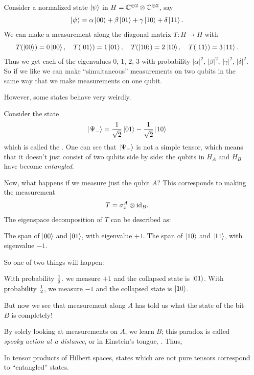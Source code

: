 \begin{example}
	\label{ex:simult_measurement}
	Consider a normalized state $\ket\psi$ in
	$H = \mathbb C^{\oplus 2} \otimes \mathbb C^{\oplus 2}$, say
	\[ \ket\psi = \alpha\ket{00} + \beta\ket{01}
		+ \gamma\ket{10} + \delta\ket{11}. \]
	We can make a measurement along the diagonal matrix
	$T \colon H \to H$ with
	\[ T(\ket{00}) = 0\ket{00}, \quad
	T(\ket{01}) = 1\ket{01}, \quad
	T(\ket{10}) = 2\ket{10}, \quad
	T(\ket{11}) = 3\ket{11}. \]
	Thus we get each of the eigenvalues $0$, $1$, $2$, $3$
	with probability $|\alpha|^2$, $|\beta|^2$, $|\gamma|^2$, $|\delta|^2$.
	So if we like we can make ``simultaneous'' measurements on two qubits
	in the same way that we make measurements on one qubit.
\end{example}

However, some states behave very weirdly.
\begin{example}
	Consider the state
	\[
		\ket{\Psi_-}
		=
		\frac{1}{\sqrt2} \ket{01}
		- \frac{1}{\sqrt2} \ket{10}
	\]
	which is called the .
	One can see that $\ket{\Psi_-}$ is not a simple tensor,
	which means that it doesn't just consist of two qubits side by side:
	the qubits in $H_A$ and $H_B$ have become \emph{entangled}.

	Now, what happens if we measure just the qubit $A$?
	This corresponds to making the measurement
	\[ T = \sigma_z^A \otimes \mathrm{id}_B. \]
	The eigenspace decomposition of $T$ can be described as:
	\begin{itemize}
		\ii The span of $\ket{00}$ and $\ket{01}$, with eigenvalue $+1$.
		\ii The span of $\ket{10}$ and $\ket{11}$, with eigenvalue $-1$.
	\end{itemize}
	So one of two things will happen:
	\begin{itemize}
		\ii With probability $\frac{1}{2}$, we measure $+1$
		and the collapsed state is $\ket{01}$.
		\ii With probability $\frac{1}{2}$, we measure $-1$
		and the collapsed state is $\ket{10}$.
	\end{itemize}
	But now we see that measurement along $A$ has told us what the
	state of the bit $B$ is completely!
\end{example}
By solely looking at measurements on $A$, we learn $B$;
this paradox is called \emph{spooky action at a distance},
or in Einstein's tongue, .
Thus,
\begin{moral}
	In tensor products of Hilbert spaces,
	states which are not pure tensors
	correspond to ``entangled'' states.
\end{moral}

